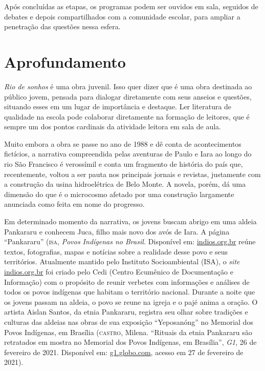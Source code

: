 \documentclass[12pt]{extarticle}
\begin{document}
  Após concluídas as etapas, os programas podem ser ouvidos em sala,
  seguidos de debates e depois compartilhados com a comunidade escolar,
  para ampliar a penetração das questões nessa esfera.

  \section{Aprofundamento}

  \emph{Rio de sonhos} é uma obra juvenil. Isso quer dizer que é uma
  obra destinada ao público jovem, pensada para dialogar diretamente com
  seus anseios e questões, situando esses em um lugar de importância e
  destaque. Ler literatura de qualidade na escola pode colaborar
  diretamente na formação de leitores, que é sempre um dos pontos
  cardinais da atividade leitora em sala de aula.

  Muito embora a obra se passe no ano de 1988 e dê conta de
  acontecimentos fictícios, a narrativa compreendida pelas aventuras de
  Paulo e Iara ao longo do rio São Francisco é verossímil e conta um
  fragmento de história do país que, recentemente, voltou a ser pauta
  nos principais jornais e revistas, justamente com a construção da
  usina hidroelétrica de Belo Monte. A novela, porém, dá uma dimensão do
  que é o microcosmo afetado por uma construção largamente anunciada
  como feita em nome do progresso.

  Em determinado momento da narrativa, os jovens buscam abrigo em uma
  aldeia Pankararu e conhecem Juca, filho mais novo dos avós de Iara. A
  página ``Pankararu'' (\textsc{isa}, \emph{Povos Indígenas no Brasil.}
  Disponível em:
  \href{https://www.indios.org.br/pt/Povo:Pankararu}{indios.org.br} reúne textos, fotografias, mapas e
  notícias sobre a realidade desse povo e seus territórios. Atualmente
  mantido pelo Instituto Socioambiental (ISA), o \emph{site}
  \href{https://www.indios.org.br/}{indios.org.br}
  foi criado pelo Cedi (Centro Ecumênico de Documentação e Informação)
  com o propósito de reunir verbetes com informações e análises de todos
  os povos indígenas que habitam o território nacional. Durante a noite
  que os jovens passam na aldeia, o povo se reune na igreja e o pajé
  anima a oração. O artista Aislan Santos, da etnia Pankararu, registra
  seu olhar sobre tradições e culturas das aldeias nas obras de sua
  exposição ``Yeposanóng'' no Memorial dos Povos Indígenas, em Brasília
  (\textsc{castro}, Milena. ``Rituais da etnia Pankararu são retratados em mostra
  no Memorial dos Povos Indígenas, em Brasília'', \emph{G1}, 26 de
  fevereiro de 2021. Disponível em:
 \href{https://g1.globo.com/google/amp/df/distrito-federal/o-que-fazer-no-distrito-federal/noticia/2021/02/26/rituais-da-etnia-pankararu-sao-retratados-em-mostra-no-memorial-dos-povos-indigenas-em-brasilia.ghtml}{g1.globo.com},
  acesso em 27 de fevereiro de 2021).
\end{document}
